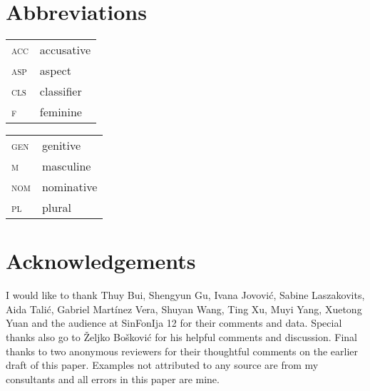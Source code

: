 \documentclass[output=paper]{langscibook}
\begin{document}
%

\section*{Abbreviations}

\begin{tabularx}{.5\textwidth}{@{}lX@{}}
\textsc{acc}&{accusative}\\
\textsc{asp}&{aspect}\\
\textsc{cls}&{classifier}\\
\textsc{f}&feminine\\
\end{tabularx}%
\begin{tabularx}{.5\textwidth}{@{}lX@{}}
\textsc{gen}&genitive\\
\textsc{m}&masculine\\
\textsc{nom}&{nominative}\\
\textsc{pl}&plural\\
\end{tabularx}

\section*{Acknowledgements}
I would like to thank Thuy Bui, Shengyun Gu, Ivana Jovović, Sabine Laszakovits, Aida Talić, Gabriel Martínez Vera, Shuyan Wang, Ting Xu, Muyi Yang, Xuetong Yuan and the audience at SinFonIja 12 for their comments and data. Special thanks also go to \v{Z}eljko Bo\v{s}kovi\'c for his helpful comments and discussion. Final thanks to two anonymous reviewers for their thoughtful comments on the earlier draft of this paper. Examples not attributed to any source are from my consultants and all errors in this paper are mine.

{}
\end{document}
